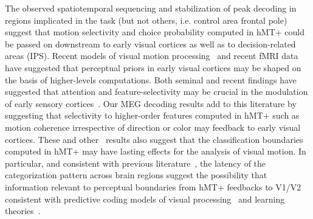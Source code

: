 The observed spatiotemporal sequencing and stabilization of peak decoding in regions implicated in the task (but not others, i.e. control area frontal pole) suggest that motion selectivity and choice probability computed in hMT+ could be passed on downstream to early visual cortices as well as to decision-related areas (IPS). Recent models of visual motion processing~\cite{4rust2006mt} and recent fMRI data~\cite{18vintch2014cortical} have suggested that perceptual priors in early visual cortices may be shaped on the basis of higher-levels computations. Both seminal and recent findings have suggested that attention and feature-selectivity may be crucial in the modulation of early sensory cortices~\cite{5kamitani2005decoding,14serences2007representation,32saproo2014attention}. Our MEG decoding results add to this literature by suggesting that selectivity to higher-order features computed in hMT+ such as motion coherence irrespective of direction or color may feedback to early visual cortices. These and other~\cite{15hogendoorn2013decoding,16van2014decoding} results also suggest that the classification boundaries computed in hMT+ may have lasting effects for the analysis of visual motion. In particular, and consistent with previous literature~\cite{5kamitani2005decoding,13kamitani2006decoding,14serences2007representation,15hogendoorn2013decoding,16van2014decoding}, the latency of the categorization pattern across brain regions suggest the possibility that information relevant to perceptual boundaries from hMT+ feedbacks to V1/V2 consistent with predictive coding models of visual processing~\cite{4rust2006mt,25rao1999predictive} and learning theories~\cite{26ahissar2004reverse,27gilbert2009perceptual,28sasaki2010advances,29roelfsema2010perceptual}.

